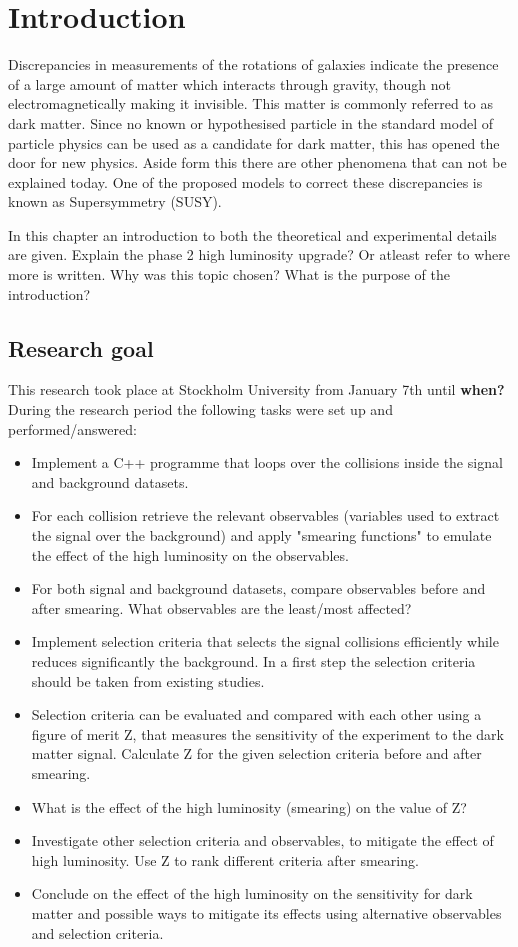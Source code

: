 \chapter{Introduction}\label{cha:intro}
Discrepancies in measurements of the rotations of galaxies indicate the presence of a large amount of matter which interacts through gravity, though not electromagnetically making it invisible. This matter is commonly referred to as dark matter. Since no known or hypothesised particle in the standard model of particle physics can be used as a candidate for dark matter, this has opened the door for new physics. Aside form this there are other phenomena that can not be explained today. One of the proposed models to correct these discrepancies is known as Supersymmetry (SUSY).  


In this chapter an introduction to both the theoretical and experimental details are given. 
Explain the phase 2 high luminosity upgrade? Or atleast refer to where more is written.
Why was this topic chosen? What is the purpose of the introduction?

\newpage
\section{Research goal}\label{sec:goal}
This research took place at Stockholm University from January 7th until \textbf{when?}
During the research period the following tasks were set up and performed/answered:
\begin{itemize}
\item Implement a C++ programme that loops over the collisions inside the signal and background datasets.	
\item For each collision retrieve the relevant observables (variables used to	 extract the signal over the background) and apply "smearing functions" to emulate the effect of the high luminosity on the observables. 	
\item For both signal and background datasets, compare observables before and after smearing. What observables are the least/most affected?	
\item Implement selection criteria that selects the signal collisions efficiently while reduces significantly the background. In a first step the selection criteria should be taken from existing studies.
\item Selection criteria can be evaluated and compared with each other using a figure of merit Z, that measures the sensitivity of the experiment to the	 dark matter signal. Calculate Z for the given selection criteria before and after smearing.
\item What is the effect of the high luminosity (smearing) on the value of Z?
\item Investigate other selection criteria and observables, to mitigate the effect of high luminosity. Use Z to rank different criteria after smearing.
\item Conclude on the effect of the high luminosity on the sensitivity for dark matter and possible ways to mitigate its effects using alternative observables and selection criteria. 
\end{itemize}
\newpage
